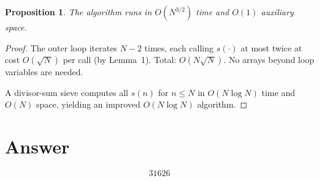 \documentclass[12pt,a4paper]{article}
\newtheorem{proposition}[theorem]{Proposition}
\theoremstyle{definition}
\begin{document}
\begin{proposition}
The algorithm runs in $O(N^{3/2})$ time and $O(1)$ auxiliary space.
\end{proposition}

\begin{proof}
The outer loop iterates $N - 2$ times, each calling $s(\cdot)$ at most twice at cost $O(\sqrt{N})$ per call (by Lemma~1). Total: $O(N \sqrt{N})$. No arrays beyond loop variables are needed.

A divisor-sum sieve computes all $s(n)$ for $n \leq N$ in $O(N \log N)$ time and $O(N)$ space, yielding an improved $O(N \log N)$ algorithm.
\end{proof}

\section{Answer}

\[
\boxed{31626}
\]
\end{document}
